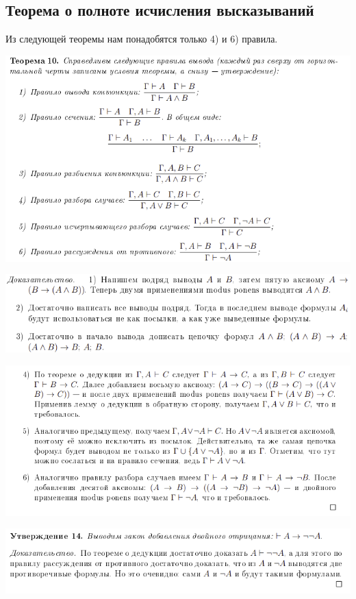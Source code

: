 \subsection{Теорема о полноте исчисления высказываний}

Из следующей теоремы нам понадобятся только 4) и 6) правила.
\par

\includegraphics[width=0.97\linewidth]{images/1.2_theorem}

\includegraphics[width=0.95\linewidth]{images/1.1_v1}

\includegraphics[width=0.95\linewidth]{images/1.1_v3}

\includegraphics[width=0.95\linewidth]{images/1.1_neg}

